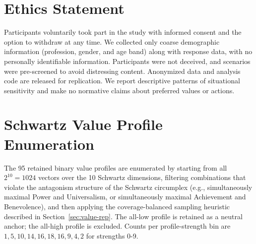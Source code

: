 \documentclass[11pt]{article}
\begin{document}
\section*{Ethics Statement}
\label{sec:ethics}


Participants voluntarily took part in the study with informed consent and the option to withdraw at any time. We collected only coarse demographic information (profession, gender, and age band) along with response data, with no personally identifiable information. Participants were not deceived, and scenarios were pre-screened to avoid distressing content. Anonymized data and analysis code are released for replication. We report descriptive patterns of situational sensitivity and make no normative claims about preferred values or actions.







\clearpage
\appendix

\section{Schwartz Value Profile Enumeration}
\label{app:profiles}


The 95 retained binary value profiles are enumerated by starting from all \(2^{10}=1024\) vectors over the 10 Schwartz dimensions, filtering combinations that violate the antagonism structure of the Schwartz circumplex \citep{schwartz2012refined} (e.g., simultaneously maximal Power and Universalism, or simultaneously maximal Achievement and Benevolence), and then applying the coverage-balanced sampling heuristic described in Section~\ref{sec:value-rep}. The all-low profile is retained as a neutral anchor; the all-high profile is excluded. Counts per profile-strength bin are \(1,5,10,14,16,18,16,9,4,2\) for strengths 0-9. 
\end{document}
